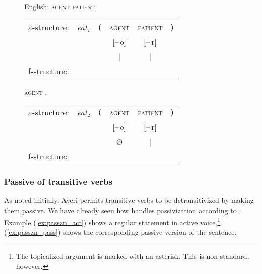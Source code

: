 \begin{figure}[h]
\pex\label{ex:engpassive}%
English:
\a \textsc{agent}  \textsc{patient}.\medskip

\begin{tabular}[t]{@{} l >{\itshape}l l c c r}
a-structure:
	& eat₁
	& ⟨
	& \textsc{agent}
	& \textsc{patient}
	& ⟩
	\\
%
	& %
	& %
	& [–\,o]
	& [–\,r]
	& %
	\\

%
	& %
	& %
	& |
	& |
	& %
	\\

f-structure:
	& %
	& %
	& \Subj
	& \Obj
	& %
	\\
\end{tabular}

\a \textsc{agent} .\medskip

\begin{tabular}[t]{@{} l >{\itshape}l l c c r}
a-structure:
	& eat₂
	& ⟨
	& \textsc{agent}
	& \textsc{patient}
	& ⟩
	\\
%
	& %
	& %
	& [–\,o]
	& [–\,r]
	& %
	\\

%
	& %
	& %
	& Ø
	& |
	& %
	\\

f-structure:
	& %
	& %
	& %
	& \Subj
	& %
	\\
\end{tabular}
\xe
\end{figure}

\subsubsection{Passive of transitive verbs}

As noted initially, Ayeri permits transitive verbs to be detransitivized by
making them passive. We have already seen how \Lfg{} handles passivization
according to \citet{bresnan2016}. Example (\ref{ex:passzn_act}) shows a regular
statement in active voice,\footnote{The topicalized argument is marked with an
asterisk. This is non-standard, however.} (\ref{ex:passzn_pass}) shows the
corresponding passive version of the sentence.


